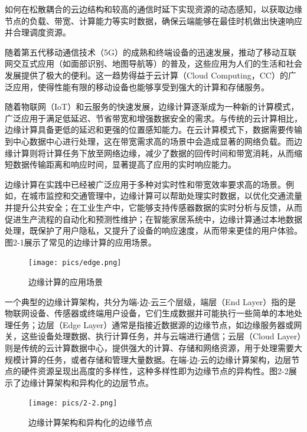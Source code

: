 
\item[3.] 如何在松散耦合的云边结构和较高的通信时延下实现资源的动态感知，以获取边缘节点的负载、带宽、计算能力等实时数据，确保云端能够在最佳时机做出快速响应并合理调度资源。

随着第五代移动通信技术（5G）的成熟和终端设备的迅速发展，推动了移动互联网交互式应用（如面部识别、地图导航等）的普及，这些应用为人们的生活和社会发展提供了极大的便利。这一趋势得益于云计算（Cloud Computing，CC）的广泛应用，使得性能有限的移动设备也能够享受到强大的计算和存储服务\cite{shafi20175g,zhang2010cloud}。

随着物联网（IoT）和云服务的快速发展，边缘计算逐渐成为一种新的计算模式，广泛应用于满足低延迟、节省带宽和增强数据安全的需求\cite{shi2016edge}。与传统的云计算相比，边缘计算具备更低的延迟和更强的位置感知能力\cite{mao2017survey,liu2019survey}。在云计算模式下，数据需要传输到中心数据中心进行处理，这在带宽需求高的场景中会造成显著的网络负载。而边缘计算则将计算任务下放至网络边缘，减少了数据的回传时间和带宽消耗，从而缩短数据传输距离和响应时间，显著提高了应用的实时响应能力\cite{shi2016edge,varghese2016challenges,khan2019edge}。

边缘计算在实践中已经被广泛应用于多种对实时性和带宽效率要求高的场景。例如，在城市监控和交通管理中，边缘计算可以帮助处理实时数据，以优化交通流量并提升公共安全\cite{yu2017survey}；在工业生产中，它能够支持传感器数据的实时分析与反馈，从而促进生产流程的自动化和预测性维护\cite{liu2019survey}；在智能家居系统中，边缘计算通过本地数据处理，既保护了用户隐私，又提升了设备的响应速度，从而带来更佳的用户体验\cite{yu2017survey}。图2-1展示了常见的边缘计算的应用场景。

\begin{figure}
    \centering
    \texttt{[image: pics/edge.png]}
    \caption{边缘计算的应用场景}
    \label{fig:my_label}
\end{figure}

一个典型的边缘计算架构，共分为端-边-云三个层级，端层（End Layer）指的是物联网设备、传感器或终端用户设备，它们生成数据并可能执行一些简单的本地处理任务；边层（Edge Layer）通常是指接近数据源的边缘节点，如边缘服务器或网关，这些设备处理数据、执行计算任务，并与云端进行通信；云层（Cloud Layer）则是传统的云计算数据中心，提供强大的计算、存储和网络资源，用于处理需要大规模计算的任务，或者存储和管理大量数据。在端-边-云的边缘计算架构，边层节点的硬件资源呈现出高度的多样性，这种多样性即为边缘节点的异构性\cite{shi2016edge,yu2017survey}。图2-2展示了边缘计算架构和异构化的边层节点。

\begin{figure}[ht]
  \centering
  \texttt{[image: pics/2-2.png]}
  \caption{边缘计算架构和异构化的边缘节点}
  \label{fig:my_label}
\end{figure}

